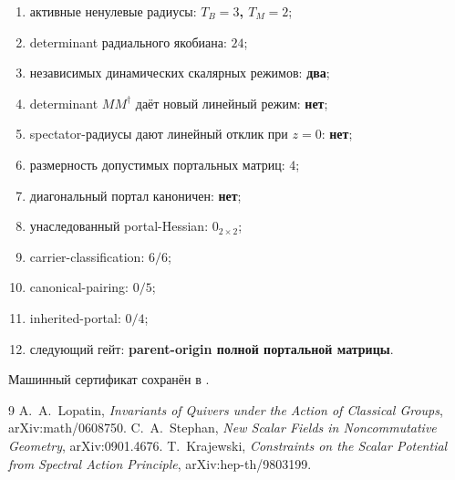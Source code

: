 \begin{protocol}\begin{enumerate}
\item активные ненулевые радиусы: \textbf{$T_B=3$, $T_M=2$};
\item determinant радиального якобиана: \textbf{$24$};
\item независимых динамических скалярных режимов: \textbf{два};
\item determinant $MM^\dagger$ даёт новый линейный режим: \textbf{нет};
\item spectator-радиусы дают линейный отклик при $z=0$: \textbf{нет};
\item размерность допустимых портальных матриц: \textbf{$4$};
\item диагональный портал каноничен: \textbf{нет};
\item унаследованный portal-Hessian: \textbf{$0_{2\times2}$};
\item carrier-classification: \textbf{$6/6$};
\item canonical-pairing: \textbf{$0/5$};
\item inherited-portal: \textbf{$0/4$};
\item следующий гейт: \textbf{parent-origin полной портальной матрицы}.
\end{enumerate}\end{protocol}

Машинный сертификат сохранён в
.

\begin{thebibliography}{9}
 A.~A.~Lopatin,
\emph{Invariants of Quivers under the Action of Classical Groups},
arXiv:math/0608750.
 C.~A.~Stephan,
\emph{New Scalar Fields in Noncommutative Geometry}, arXiv:0901.4676.
 T.~Krajewski,
\emph{Constraints on the Scalar Potential from Spectral Action Principle},
arXiv:hep-th/9803199.
\end{thebibliography}